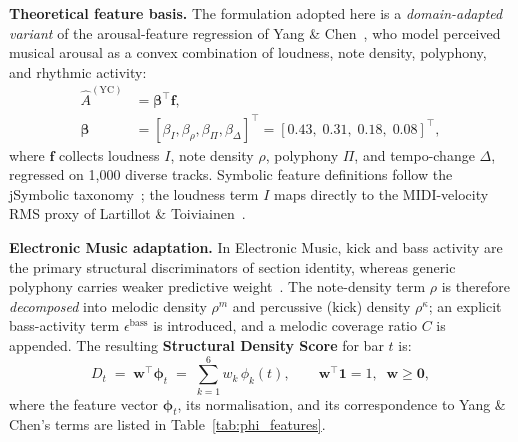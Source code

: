 \documentclass[pdflatex,sn-mathphys-num,twocolumn]{sn-jnl}
\theoremstyle{thmstyleone}
\theoremstyle{thmstyletwo}
\begin{document}
\textbf{Theoretical feature basis.}
The formulation adopted here is a \emph{domain-adapted variant} of the arousal-feature regression of Yang \& Chen~\cite{yang2012machine}, who model perceived musical arousal as a convex combination of loudness, note density, polyphony, and rhythmic activity:
\begin{align}\label{eq:yang_arousal}
  \hat{A}^{(\mathrm{YC})} &= \boldsymbol{\beta}^{\!\top}\mathbf{f}, \nonumber\\
  \boldsymbol{\beta} &= [\beta_{I},\beta_{\rho},\beta_{\Pi},\beta_{\Delta}]^{\!\top}
  = [0.43,\;0.31,\;0.18,\;0.08]^{\!\top},
\end{align}
where $\mathbf{f}$ collects loudness $I$, note density $\rho$, polyphony $\Pi$, and tempo-change $\Delta$, regressed on 1{,}000 diverse tracks.
Symbolic feature definitions follow the jSymbolic taxonomy~\cite{mckay2006jsymbolic}; the loudness term $I$ maps directly to the MIDI-velocity RMS proxy of Lartillot \& Toiviainen~\cite{lartillot2007mir}.

\textbf{Electronic Music adaptation.}
In Electronic Music, kick and bass activity are the primary structural discriminators of section identity, whereas generic polyphony carries weaker predictive weight~\cite{zelechowski2021edm}.
The note-density term $\rho$ is therefore \emph{decomposed} into melodic density $\rho^{m}$ and percussive (kick) density $\rho^{\kappa}$; an explicit bass-activity term $\epsilon^{\mathrm{bass}}$ is introduced, and a melodic coverage ratio $C$ is appended.
The resulting \textbf{Structural Density Score} for bar $t$ is:
\begin{equation}\label{eq:energy}
  D_t \;=\; \boldsymbol{w}^{\!\top}\boldsymbol{\phi}_t
        \;=\; \sum_{k=1}^{6} w_k\,\phi_k(t),
  \qquad \boldsymbol{w}^{\!\top}\mathbf{1}=1,\;\; \boldsymbol{w}\geq\mathbf{0},
\end{equation}
where the feature vector $\boldsymbol{\phi}_t$, its normalisation, and its correspondence
to Yang \& Chen's terms are listed in Table~\ref{tab:phi_features}.
\end{document}
